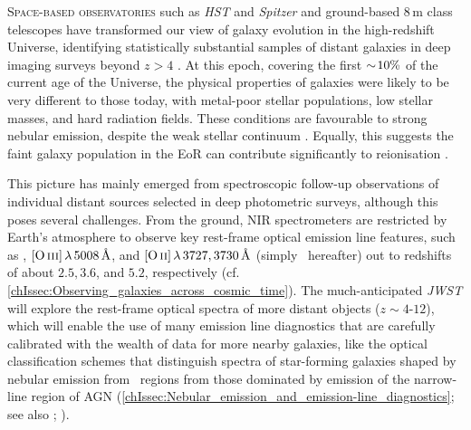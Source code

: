 \lettrine{S}{pace-based observatories} such as \textit{HST} and \textit{Spitzer} and ground-based $8 \, \mathrm{m}$ class telescopes have transformed our view of galaxy evolution in the high-redshift Universe, identifying statistically substantial samples of distant galaxies in deep imaging surveys beyond $z>4$ \citep{2014ARA&A..52..415M}. At this epoch, covering the first $\sim \! 10\%$ of the current age of the Universe, the physical properties of galaxies were likely to be very different to those today, with metal-poor stellar populations, low stellar masses, and hard radiation fields. These conditions are favourable to strong nebular emission, despite the weak stellar continuum \citep[e.g.][]{2016ARA&A..54..761S}. Equally, this suggests the faint galaxy population in the EoR can contribute significantly to reionisation \citep[e.g.][]{2015ApJ...803...34B}.

This picture has mainly emerged from spectroscopic follow-up observations of individual distant sources selected in deep photometric surveys, although this poses several challenges. From the ground, NIR spectrometers are restricted by Earth's atmosphere to observe key rest-frame optical emission line features, such as \Halpha, $\OIIIf \, \lambda \, 5008 \, \Angstrom$, and $\OII \, \lambda \, 3727, 3730 \, \Angstrom$ (simply \OII\ hereafter) out to redshifts of about $2.5, 3.6$, and $5.2$, respectively (cf. \cref{chIssec:Observing_galaxies_across_cosmic_time}). The much-anticipated \textit{JWST} will explore the rest-frame optical spectra of more distant objects ($z \sim 4$-$12$), which will enable the use of many emission line diagnostics that are carefully calibrated with the wealth of data for more nearby galaxies, like the optical classification schemes that distinguish spectra of star-forming galaxies shaped by nebular emission from \HII\ regions from those dominated by emission of the narrow-line region of AGN (\cref{chIssec:Nebular_emission_and_emission-line_diagnostics}; see also ; \citealt{1987ApJS...63..295V}).

